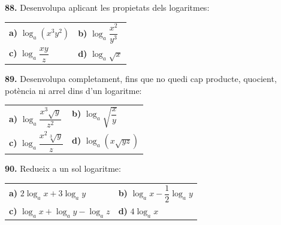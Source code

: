 \documentclass[13pt,a4paper]{extarticle}
\begin{document}
\par\noindent\begin{minipage}{\linewidth}
\textbf{88.} Desenvolupa aplicant les propietats dels logaritmes:\par

\begin{tabular}{@{}p{.46\linewidth}p{.46\linewidth}@{}}
\textbf{a)} $\log_a\left(x^3 y^2\right)$ & \textbf{b)} $\log_a \dfrac{x^2}{y^3}$ \\[2pt]
\textbf{c)} $\log_a \dfrac{xy}{z}$ & \textbf{d)} $\log_a \sqrt{x}$ \\[2pt]
\end{tabular}\par
\end{minipage}\par\vspace{1.6mm}
\par\noindent\begin{minipage}{\linewidth}
\textbf{89.} Desenvolupa completament, fins que no quedi cap producte, quocient, potència ni arrel dins d'un logaritme:\par

\begin{tabular}{@{}p{.46\linewidth}p{.46\linewidth}@{}}
\textbf{a)} $\log_a \dfrac{x^3\sqrt{y}}{z^2}$ & \textbf{b)} $\log_a \sqrt{\dfrac{x}{y}}$ \\[2pt]
\textbf{c)} $\log_a \dfrac{x^2\sqrt[3]{y}}{z}$ & \textbf{d)} $\log_a \left(x\sqrt{yz}\right)$ \\[2pt]
\end{tabular}\par
\end{minipage}\par\vspace{1.6mm}
\par\noindent\begin{minipage}{\linewidth}
\textbf{90.} Redueix a un sol logaritme:\par

\begin{tabular}{@{}p{.46\linewidth}p{.46\linewidth}@{}}
\textbf{a)} $2\log_a x+3\log_a y$ & \textbf{b)} $\log_a x-\dfrac12\log_a y$ \\[2pt]
\textbf{c)} $\log_a x+\log_a y-\log_a z$ & \textbf{d)} $4\log_a x$ \\[2pt]
\end{tabular}\par
\end{minipage}\par\vspace{1.6mm}
\end{document}
